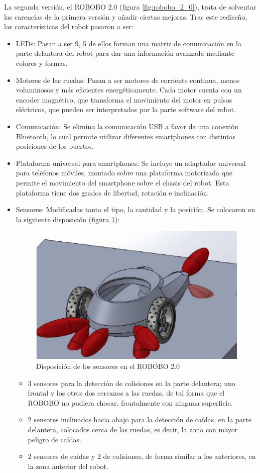 La segunda versión, el ROBOBO 2.0 (figura \ref{fig:robobo_2_0}), trata de solventar las carencias de la primera versión y añadir ciertas mejoras. Tras este rediseño, las características del robot pasaron a ser:

\begin{itemize}	

	\item LEDs: Pasan a ser 9, 5 de ellos forman una matriz de comunicación en la parte delantera del robot para dar una información avanzada mediante colores y formas.
	\item Motores de las ruedas: Pasan a ser motores de corriente continua, menos voluminosos y más eficientes energéticamente. Cada motor cuenta con un encoder magnético, que transforma el movimiento del motor en pulsos eléctricos, que pueden ser interpretados por la parte software del robot.
	\item Comunicación: Se elimina la comunicación USB a favor de una conexión Bluetooth, lo cual permite utilizar diferentes smartphones con distintas posiciones de los puertos.
	\item Plataforma universal para smartphones: Se incluye un adaptador universal para teléfonos móviles, montado sobre una plataforma motorizada que permite el movimiento del smartphone sobre el chasis del robot. Esta plataforma tiene dos grados de libertad, rotación e inclinación.
	\item Sensores: Modificadas tanto el tipo, la cantidad y la posición. Se colocaron en la siguiente disposición (figura \ref{fig:robobo_2_0_sensors}):
	\begin{figure}
	\centering
	\includegraphics[width=0.8\linewidth]{imagenes/robobo_2_sensors.png}
	\caption{Disposición de los sensores en el ROBOBO 2.0}
	\label{fig:robobo_2_0_sensors}
\end{figure} 
	\begin{itemize}
	\item 3 sensores para la detección de colisiones en la parte delantera; uno frontal y los otros dos cercanos a las ruedas, de tal forma que el ROBOBO no pudiera chocar, frontalmente con ninguna superficie.
	\item 2 sensores inclinados hacia abajo para la detección de caídas, en la parte delantera, colocados cerca de las ruedas, es decir, la zona con mayor peligro de caídas.
	\item 2 sensores de caídas y 2 de colisiones, de forma similar a los anteriores, en la zona anterior del robot. 
	

\end{itemize}
\end{itemize}
